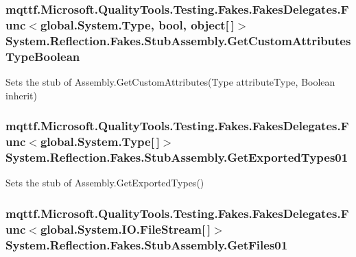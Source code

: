 \hypertarget{class_system_1_1_reflection_1_1_fakes_1_1_stub_assembly_a565030f6da1d2d27e9047e3261306e4d}{
\subsubsection[{Get\-Custom\-Attributes\-Type\-Boolean}]{\setlength{\rightskip}{0pt plus 5cm}mqttf.\-Microsoft.\-Quality\-Tools.\-Testing.\-Fakes.\-Fakes\-Delegates.\-Func$<$global.\-System.\-Type, bool, object\mbox{[}$\,$\mbox{]}$>$ System.\-Reflection.\-Fakes.\-Stub\-Assembly.\-Get\-Custom\-Attributes\-Type\-Boolean}}\label{class_system_1_1_reflection_1_1_fakes_1_1_stub_assembly_a565030f6da1d2d27e9047e3261306e4d}


Sets the stub of Assembly.\-Get\-Custom\-Attributes(\-Type attribute\-Type, Boolean inherit)

\hypertarget{class_system_1_1_reflection_1_1_fakes_1_1_stub_assembly_ae2ed47b15789b7f401d00e26cd6fc147}{
\subsubsection[{Get\-Exported\-Types01}]{\setlength{\rightskip}{0pt plus 5cm}mqttf.\-Microsoft.\-Quality\-Tools.\-Testing.\-Fakes.\-Fakes\-Delegates.\-Func$<$global.\-System.\-Type\mbox{[}$\,$\mbox{]}$>$ System.\-Reflection.\-Fakes.\-Stub\-Assembly.\-Get\-Exported\-Types01}}\label{class_system_1_1_reflection_1_1_fakes_1_1_stub_assembly_ae2ed47b15789b7f401d00e26cd6fc147}


Sets the stub of Assembly.\-Get\-Exported\-Types()

\hypertarget{class_system_1_1_reflection_1_1_fakes_1_1_stub_assembly_a19a470b0eb8b5277c959b0e7ef711085}{
\subsubsection[{Get\-Files01}]{\setlength{\rightskip}{0pt plus 5cm}mqttf.\-Microsoft.\-Quality\-Tools.\-Testing.\-Fakes.\-Fakes\-Delegates.\-Func$<$global.\-System.\-I\-O.\-File\-Stream\mbox{[}$\,$\mbox{]}$>$ System.\-Reflection.\-Fakes.\-Stub\-Assembly.\-Get\-Files01}}\label{class_system_1_1_reflection_1_1_fakes_1_1_stub_assembly_a19a470b0eb8b5277c959b0e7ef711085}


